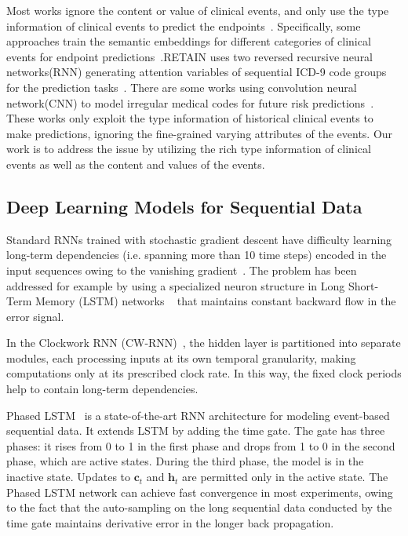 \documentclass[letterpaper]{article} %
\begin{document}
Most works ignore the content or value of clinical events, and only use the type information of clinical events to predict the endpoints~\cite{Liu2015Temporal}. Specifically,  some approaches train the semantic embeddings for different categories of clinical events for endpoint predictions~\cite{Henriksson2015Modeling}.RETAIN uses two reversed recursive neural networks(RNN) generating attention variables of sequential ICD-9 code groups for the prediction tasks~\cite{choi2016retain}. There are some works using convolution neural network(CNN) to model irregular medical codes for future risk predictions~\cite{nguyen2016deepr}. These works only exploit the type information of historical clinical events to make predictions, ignoring the fine-grained varying attributes of the events. Our work is to address the issue by utilizing the rich type information of clinical events as well as the content and values of the events.

\subsection{Deep Learning Models for Sequential Data}

Standard RNNs trained with stochastic gradient descent
have difficulty learning long-term dependencies (i.e. spanning
more than 10 time steps) encoded in the input sequences
owing to the vanishing gradient~\cite{hochreiter2001gradient}. The problem has been addressed for example by using a specialized neuron structure in Long Short-Term Memory (LSTM) networks ~\cite{hochreiter1997long} that maintains constant backward flow in the error signal.

In the Clockwork RNN (CW-RNN)~\cite{koutnik2014clockwork}, the hidden layer is partitioned into separate modules, each processing inputs at its own temporal granularity, making computations only at its prescribed clock rate. In this way, the fixed clock periods help to contain long-term dependencies.

Phased LSTM ~\cite{neil2016phased}is a state-of-the-art RNN architecture for modeling event-based sequential data. It extends LSTM by adding the time gate.  The gate has three phases: it rises from 0 to 1 in the first phase and drops from 1 to 0 in the second phase, which are active states. During the third phase, the model is in the inactive state. Updates to $\bm c_t$ and $\bm h_t$ are permitted only in the active state. The Phased LSTM network can achieve fast convergence in most experiments, owing to the fact that the auto-sampling on the long sequential data conducted by the time gate maintains derivative error in the longer back propagation.
\end{document}
